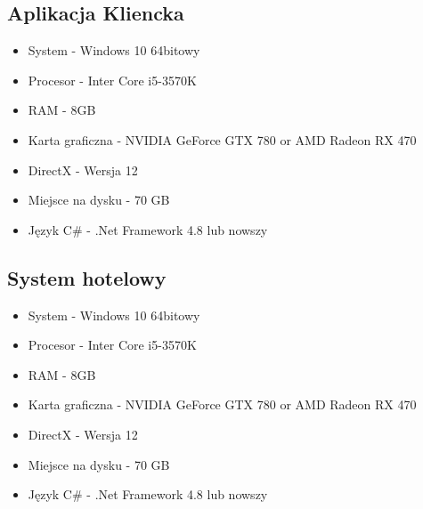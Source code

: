 \documentclass{article}
\begin{document}
\subsection{Aplikacja Kliencka}
\begin{itemize}
    \item System - Windows 10 64bitowy
    \item Procesor - Inter Core i5-3570K
    \item RAM - 8GB
    \item Karta graficzna - NVIDIA GeForce GTX 780 or AMD Radeon RX 470
    \item DirectX - Wersja 12
    \item Miejsce na dysku - 70 GB
    \item Język C\# - .Net Framework 4.8 lub nowszy
\end{itemize}
\subsection{System hotelowy}
\begin{itemize}
    \item System - Windows 10 64bitowy
    \item Procesor - Inter Core i5-3570K
    \item RAM - 8GB
    \item Karta graficzna - NVIDIA GeForce GTX 780 or AMD Radeon RX 470
    \item DirectX - Wersja 12
    \item Miejsce na dysku - 70 GB
    \item Język C\# - .Net Framework 4.8 lub nowszy
\end{itemize}
\end{document}
